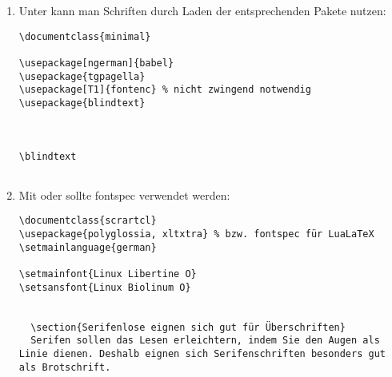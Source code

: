 % 


\begin{enumerate}[label=\alph*)]
		\item Unter  kann man Schriften durch Laden der entsprechenden Pakete nutzen:

\begin{lstlisting}
\documentclass{minimal}

\usepackage[ngerman]{babel}
\usepackage{tgpagella}
\usepackage[T1]{fontenc} % nicht zwingend notwendig
\usepackage{blindtext}



\blindtext


\end{lstlisting}


		\item Mit  oder  sollte fontspec verwendet werden: 

\begin{lstlisting}
\documentclass{scrartcl}
\usepackage{polyglossia, xltxtra} % bzw. fontspec für LuaLaTeX
\setmainlanguage{german}

\setmainfont{Linux Libertine O}
\setsansfont{Linux Biolinum O}


  \section{Serifenlose eignen sich gut für Überschriften}
  Serifen sollen das Lesen erleichtern, indem Sie den Augen als Linie dienen. Deshalb eignen sich Serifenschriften besonders gut als Brotschrift.

\end{lstlisting}

\end{enumerate}


